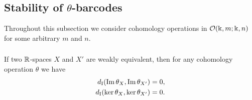\subsection{Stability of $\theta$-barcodes}\label{ss:stability}

Throughout this subsection we consider cohomology operations in $\mathcal{O}(\Bbbk, m; \Bbbk, n)$ for some arbitrary $m$ and $n$.



%
%

\subsubsection{}\label{lem:w.h.e. preservance}
\lemma If two $\mathbb{R}$-spaces $X$ and $X'$ are weakly equivalent, then for any cohomology operation $\theta$ we have
\begin{align*}
	d_{\mathrm{I}}(\operatorname{Im}\theta_{X},\operatorname{Im}\theta_{X'}) &= 0, \\
	d_{\mathrm{I}}(\ker\theta_{X}, \ker\theta_{X'}) &= 0.
\end{align*}

